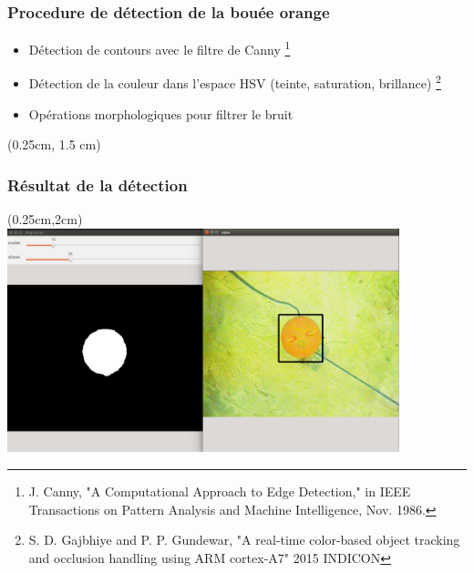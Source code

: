 \documentclass[10pt]{beamer}
\begin{document}
\begin{frame}
\frametitle{Procedure de détection de la bouée orange}
\begin{itemize}
\item <1-> Détection de contours avec le filtre de Canny \footnote{J. Canny, "A Computational Approach to Edge Detection," in IEEE Transactions on Pattern Analysis and Machine Intelligence, Nov. 1986.}
\item <2-> Détection de la couleur dans l'espace HSV (teinte, saturation, brillance) \footnote{S. D. Gajbhiye and P. P. Gundewar, "A real-time color-based object tracking and occlusion handling using ARM cortex-A7" 2015 INDICON} \\
\item <3-> Opérations morphologiques pour filtrer le bruit
\end{itemize}
\end{frame}

\begin{frame}
\begin{textblock*}{12.3cm}(0.25cm, 1.5 cm) %
\frametitle{Résultat de la détection}
\end{textblock*}
\begin{textblock*}{12.3cm}(0.25cm,2cm) %
\centering
\includegraphics[height=6.5cm, keepaspectratio]{Pictures/tracking_orange_ball.png}
\end{textblock*}
\end{frame}
\end{document}
